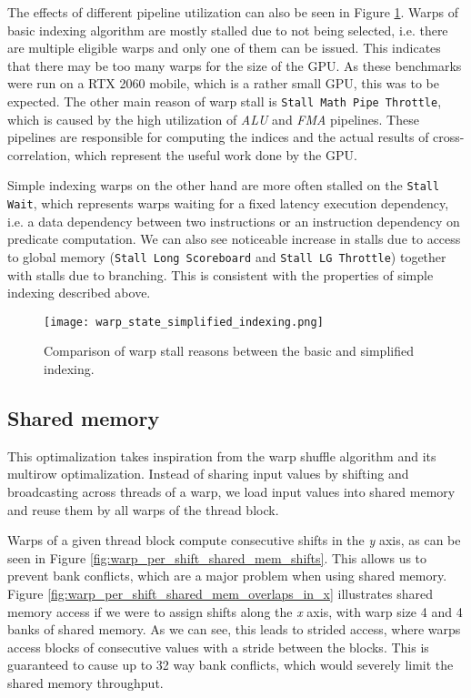 The effects of different pipeline utilization can also be seen in Figure \ref{fig:warp_state_simplified_indexing}. Warps of basic indexing algorithm are mostly stalled due to not being selected, i.e. there are multiple eligible warps and only one of them can be issued. This indicates that there may be too many warps for the size of the GPU. As these benchmarks were run on a RTX 2060 mobile, which is a rather small GPU, this was to be expected. The other main reason of warp stall is \texttt{Stall Math Pipe Throttle}, which is caused by the high utilization of \textit{ALU} and \textit{FMA} pipelines. These pipelines are responsible for computing the indices and the actual results of cross-correlation, which represent the useful work done by the GPU.

Simple indexing warps on the other hand are more often stalled on the \texttt{Stall Wait}, which represents warps waiting for a fixed latency execution dependency, i.e. a data dependency between two instructions or an instruction dependency on predicate computation. We can also see noticeable increase in stalls due to access to global memory (\texttt{Stall Long Scoreboard} and \texttt{Stall LG Throttle}) together with stalls due to branching. This is consistent with the properties of simple indexing described above.

\begin{figure}[ht]
	\centering
	\texttt{[image: warp\_state\_simplified\_indexing.png]}
	\caption{Comparison of warp stall reasons between the basic and simplified indexing.}
	\label{fig:warp_state_simplified_indexing}
\end{figure}

\subsection{Shared memory}
\label{sec:warp_per_shift_shared_mem}

This optimalization takes inspiration from the warp shuffle algorithm and its multirow optimalization. Instead of sharing input values by shifting and broadcasting across threads of a warp, we load input values into shared memory and reuse them by all warps of the thread block.

Warps of a given thread block compute consecutive shifts in the \textit{y} axis, as can be seen in Figure \ref{fig:warp_per_shift_shared_mem_shifts}. This allows us to prevent bank conflicts, which are a major problem when using shared memory. Figure \ref{fig:warp_per_shift_shared_mem_overlaps_in_x} illustrates shared memory access if we were to assign shifts along the \textit{x} axis, with warp size 4 and 4 banks of shared memory. As we can see, this leads to strided access, where warps access blocks of consecutive values with a stride between the blocks. This is guaranteed to cause up to 32 way bank conflicts, which would severely limit the shared memory throughput.

